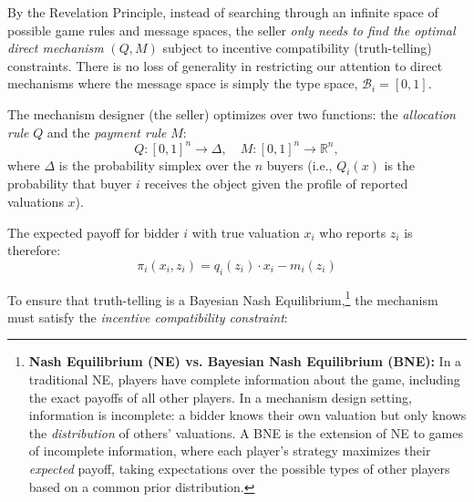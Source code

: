By the Revelation Principle, instead of searching through an infinite space of possible game rules and message spaces, the seller \textit{only needs to find the optimal direct mechanism} $(Q, M)$ subject to incentive compatibility (truth-telling) constraints. There is no loss of generality in restricting our attention to direct mechanisms where the message space is simply the type space, $\mathcal{B}_i = [0,1]$. 

The mechanism designer (the seller) optimizes over two functions: the \textit{allocation rule} $Q$ and the \textit{payment rule} $M$:
  \[
  Q: [0,1]^n \to \Delta, \quad M: [0,1]^n \to \mathbb{R}^n,
  \]
  where $\Delta$ is the probability simplex over the $n$ buyers (i.e., $Q_i(x)$ is the probability that buyer $i$ receives the object given the profile of reported valuations $x$).


The expected payoff for bidder $i$ with true valuation $x_i$ who reports $z_i$ is therefore:
\[
\pi_i(x_i, z_i) = q_i(z_i) \cdot x_i - m_i(z_i)
\]

To ensure that truth-telling is a Bayesian Nash Equilibrium,\footnote{\textbf{Nash Equilibrium (NE) vs. Bayesian Nash Equilibrium (BNE):} In a traditional NE, players have complete information about the game, including the exact payoffs of all other players. In a mechanism design setting, information is incomplete: a bidder knows their own valuation but only knows the \textit{distribution} of others' valuations. A BNE is the extension of NE to games of incomplete information, where each player's strategy maximizes their \textit{expected} payoff, taking expectations over the possible types of other players based on a common prior distribution.} the mechanism must satisfy the \textit{incentive compatibility constraint}:

